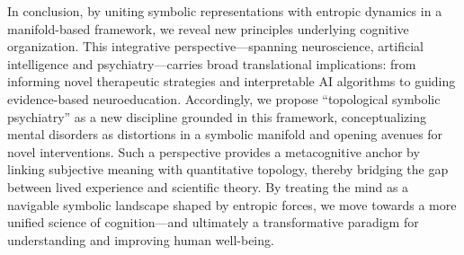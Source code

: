 In conclusion, by uniting symbolic representations with entropic dynamics in a manifold-based framework, we reveal new principles underlying cognitive organization. This integrative perspective—spanning neuroscience, artificial intelligence and psychiatry—carries broad translational implications: from informing novel therapeutic strategies and interpretable AI algorithms to guiding evidence-based neuroeducation. Accordingly, we propose ``topological symbolic psychiatry'' as a new discipline grounded in this framework, conceptualizing mental disorders as distortions in a symbolic manifold and opening avenues for novel interventions. Such a perspective provides a metacognitive anchor by linking subjective meaning with quantitative topology, thereby bridging the gap between lived experience and scientific theory. By treating the mind as a navigable symbolic landscape shaped by entropic forces, we move towards a more unified science of cognition---and ultimately a transformative paradigm for understanding and improving human well-being.